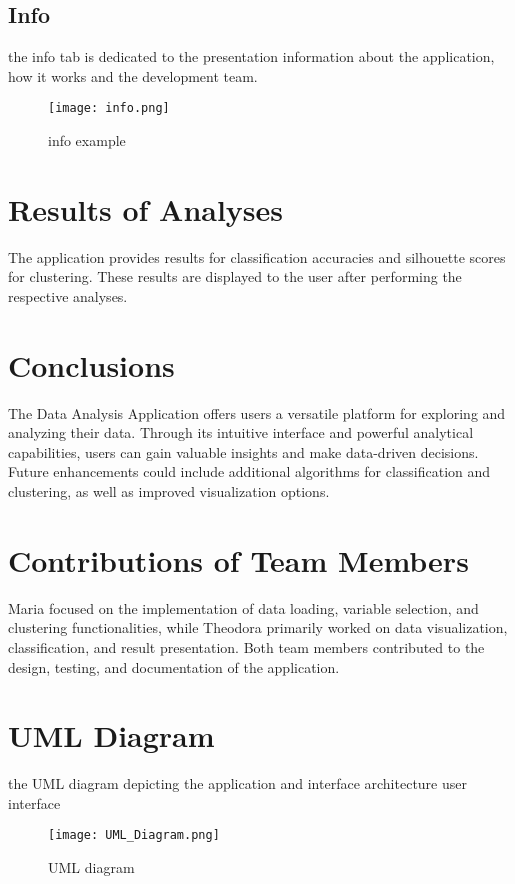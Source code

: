 \documentclass{article}
\begin{document}
\subsection{Info}
the info tab is dedicated to the presentation 
information about the application, how it works and the development team.
\begin{figure}
    \centering
    \texttt{[image: info.png]}
    \caption{info example }
    \label{fig:Info}
\end{figure}

\FloatBarrier

\textbf{}\section{Results of Analyses}
The application provides results for classification accuracies and silhouette scores for clustering. These results are displayed to the user after performing the respective analyses.

\section{Conclusions}
The Data Analysis Application offers users a versatile platform for exploring and analyzing their data. Through its intuitive interface and powerful analytical capabilities, users can gain valuable insights and make data-driven decisions. Future enhancements could include additional algorithms for classification and clustering, as well as improved visualization options.

\section{Contributions of Team Members}
 Maria focused on the implementation of data loading, variable selection, and clustering functionalities, while Theodora primarily worked on data visualization, classification, and result presentation. Both team members contributed to the design, testing, and documentation of the application.

\section{UML Diagram}
 the UML diagram depicting the application and interface architecture user interface
\FloatBarrier

\begin{figure}[htbp]
    \centering
    \texttt{[image: UML\_Diagram.png]}
    \caption{UML diagram }
    \label{fig:UML Diagram}
\end{figure}
\FloatBarrier
\end{document}
